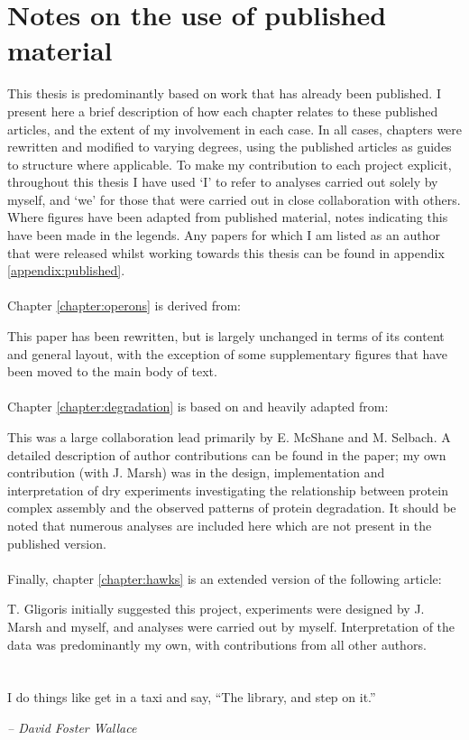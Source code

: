 \documentclass[a4paper,11pt,twoside,openright]{scrbook}
\begin{document}
\chapter*{Notes on the use of published material}
This thesis is predominantly based on work that has already been published. I present here a brief description of how each chapter relates to these published articles, and the extent of my involvement in each case. In all cases, chapters were rewritten and modified to varying degrees, using the published articles as guides to structure where applicable. To make my contribution to each project explicit, throughout this thesis I have used `I' to refer to analyses carried out solely by myself, and `we' for those that were carried out in close collaboration with others. Where figures have been adapted from published material, notes indicating this have been made in the legends. Any papers for which I am listed as an author that were released whilst working towards this thesis can be found in appendix \ref{appendix:published}.
\\~\\
Chapter \ref{chapter:operons} is derived from:
\begin{quote}
\end{quote}
This paper has been rewritten, but is largely unchanged in terms of its content and general layout, with the exception of some supplementary figures that have been moved to the main body of text.
\\~\\
Chapter \ref{chapter:degradation} is based on and heavily adapted from:
\begin{quote}
\end{quote}
This was a large collaboration lead primarily by E. McShane and M. Selbach. A detailed description of author contributions can be found in the paper; my own contribution (with J. Marsh) was in the design, implementation and interpretation of dry experiments investigating the relationship between protein complex assembly and the observed patterns of protein degradation. It should be noted that numerous analyses are included here which are not present in the published version.
\\~\\
Finally, chapter \ref{chapter:hawks} is an extended version of the following article:
\clearpage
\begin{quote}
\end{quote}
T. Gligoris initially suggested this project, experiments were designed by J. Marsh and myself, and analyses were carried out by myself. Interpretation of the data was predominantly my own, with contributions from all other authors.

\chapter*{}
\setlength{\epigraphwidth}{0.38\textwidth}
\epigraph{I do things like get in a taxi and say, ``The library, and step on it.''}{\textit{-- David Foster Wallace}}
\end{document}
